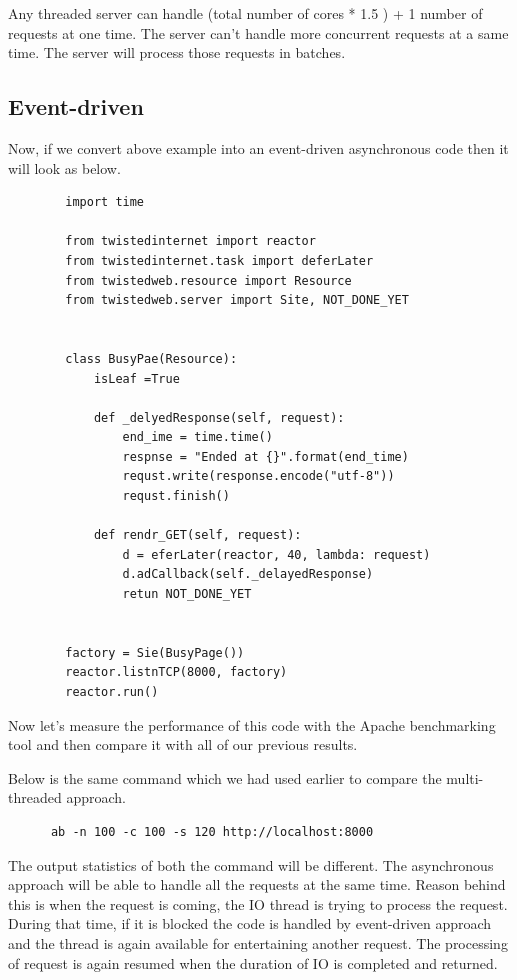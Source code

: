 \documentclass{article}
\begin{document}
      Any threaded server can handle (total number of cores * 1.5 ) + 1 number
      of requests at one time. The server can't handle more concurrent requests
      at a same time. The server will process those requests in batches.

    \subsection{Event-driven}
      Now, if we convert above example into an event-driven asynchronous code
      then it will look as below.

      \begin{verbatim}
        import time

        from twistedinternet import reactor
        from twistedinternet.task import deferLater
        from twistedweb.resource import Resource
        from twistedweb.server import Site, NOT_DONE_YET


        class BusyPae(Resource):
            isLeaf =True

            def _delyedResponse(self, request):
                end_ime = time.time()
                respnse = "Ended at {}".format(end_time)
                requst.write(response.encode("utf-8"))
                requst.finish()

            def rendr_GET(self, request):
                d = eferLater(reactor, 40, lambda: request)
                d.adCallback(self._delayedResponse)
                retun NOT_DONE_YET


        factory = Sie(BusyPage())
        reactor.listnTCP(8000, factory)
        reactor.run()
      \end{verbatim}

    Now let's measure the performance of this code with the Apache benchmarking
    tool and then compare it with all of our previous results.

    Below is the same command which we had used earlier to compare the
    multi-threaded approach.

    \begin{verbatim}
      ab -n 100 -c 100 -s 120 http://localhost:8000
    \end{verbatim}

    The output statistics of both the command will be different. The
    asynchronous approach will be able to handle all the requests at the same
    time. Reason behind this is when the request is coming, the IO thread is
    trying to process the request. During that time, if it is blocked the code
    is handled by event-driven approach and the thread is again available for
    entertaining another request. The processing of request is again resumed
    when the duration of IO is completed and returned.
\end{document}
